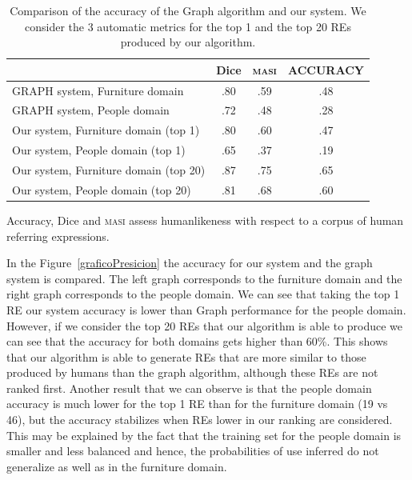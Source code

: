 \begin{table}[h!]
\begin{center}
\begin{tabular}{|l|c|c|c|}
\hline
	 	& 	Dice		&	\textsc{masi}	&	ACCURACY		\\
\hline
GRAPH system, Furniture domain	& 	.80 		&	.59	&	.48		 	\\
GRAPH system, People domain 	& 	.72		&	.48	&	.28			\\
\hline
Our system, Furniture domain (top 1)	&	.80		&	.60	&	.47		\\
Our system, People domain (top 1)	&	.65		&	.37	&	.19		\\
\hline
Our system, Furniture domain (top 20)&	.87		&	.75  	&	.65		\\
Our system, People domain (top 20)   &	.81		&	.68	&	.60		\\
\hline
\end{tabular}
\caption{Comparison of the accuracy of the Graph algorithm and our system. We consider the 3 automatic metrics for the top 1 and the top 20 REs produced by our algorithm.}
\label{Tabla_sis_1_20}
\end{center}
\end{table}


Accuracy, Dice and \textsc{masi} assess humanlikeness with respect to a corpus of human referring expressions.

In the Figure~\ref{graficoPresicion} the accuracy for our system and the graph system is compared. The left graph corresponds to the furniture domain and the right graph corresponds to the people domain. We can see that taking the top 1 RE our system accuracy is lower than Graph performance for the people domain. However, if we consider the top 20 REs that our algorithm is able to produce we can see that the accuracy for both domains gets higher than 60\%. This shows that our algorithm is able to generate REs that are more similar to those produced by humans than the graph algorithm, although these REs are not ranked first. Another result that we can observe is that the people domain accuracy is much lower for the top 1 RE than for the furniture domain (19 vs 46), but the accuracy stabilizes when REs lower in our ranking are considered. This may be explained by the fact that the training set for the people domain is smaller and less balanced and hence, the probabilities of use inferred do not generalize as well as in the furniture domain. 


